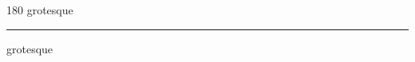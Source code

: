 
\begin{frame}
\begin{center}
\begin{turn}{180}
{\fontsize{2.5cm}{1em}\selectfont grotesque}
\end{turn}
\vspace{1em}\par  
\hrule
\vspace{1em}\par  
{\fontsize{2.5cm}{1em}\selectfont grotesque}
\end{center}
\end{frame}
